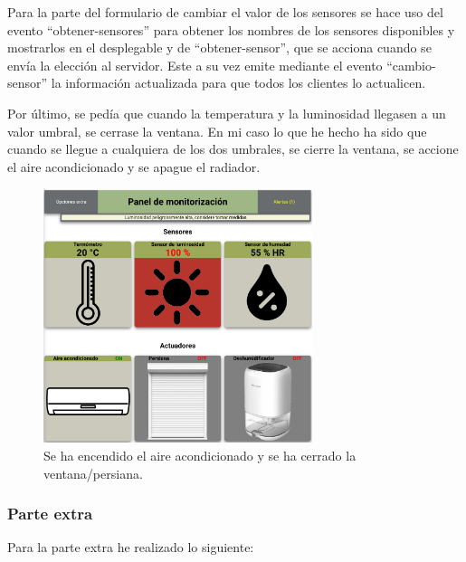 \documentclass{article}
\begin{document}
\bigskip

Para la parte del formulario de cambiar el valor de los sensores se hace uso del evento ``obtener-sensores'' para obtener los nombres de los sensores disponibles y mostrarlos en el desplegable y de ``obtener-sensor'', que se acciona cuando se envía la elección al servidor. Este a su vez emite mediante el evento ``cambio-sensor'' la información actualizada para que todos los clientes lo actualicen.

\bigskip

Por último, se pedía que cuando la temperatura y la luminosidad llegasen a un valor umbral, se cerrase la ventana. En mi caso lo que he hecho ha sido que cuando se llegue a cualquiera de los dos umbrales, se cierre la ventana, se accione el aire acondicionado y se apague el radiador.

\begin{figure}[H]
    \centering
    \includegraphics[width=0.7\textwidth]{images/muchaluz.png}
    \caption{Se ha encendido el aire acondicionado y se ha cerrado la ventana/persiana.}
\end{figure}

\newpage

\subsubsection{Parte extra}
Para la parte extra he realizado lo siguiente:
\end{document}
